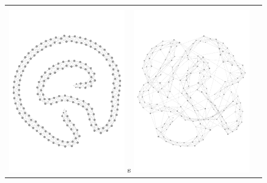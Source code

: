 \documentclass[paperwidth=42in, paperheight=33.1in,landscape,showframe,fontscale=.42]{baposter}
\begin{document}
\begin{poster}
{		    \begin{tabular}{ c c}
			& \\
			\includegraphics[width=5cm]{img/g02.pdf}
			s \includegraphics[width=5cm]{img/g42.pdf}

		    \end{tabular}



}
\end{poster}
\end{document}
